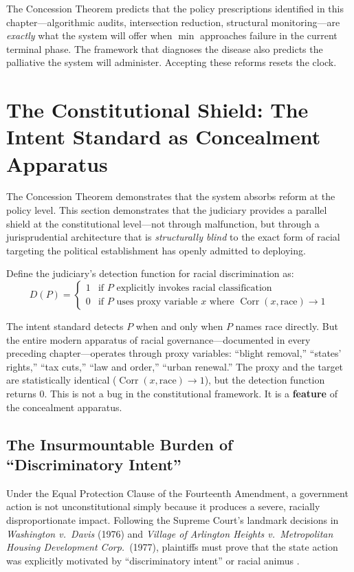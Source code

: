 \documentclass[12pt,openany]{book}
\begin{document}
The Concession Theorem predicts that the policy prescriptions identified in this chapter---algorithmic audits, intersection reduction, structural monitoring---are \textit{exactly} what the system will offer when $\min$ approaches failure in the current terminal phase. The framework that diagnoses the disease also predicts the palliative the system will administer. Accepting these reforms resets the clock.

\section{The Constitutional Shield: The Intent Standard as Concealment Apparatus}

The Concession Theorem demonstrates that the system absorbs reform at the policy level. This section demonstrates that the judiciary provides a parallel shield at the constitutional level---not through malfunction, but through a jurisprudential architecture that is \textit{structurally blind} to the exact form of racial targeting the political establishment has openly admitted to deploying.

Define the judiciary's detection function for racial discrimination as:
\[
D(P) = \begin{cases}
1 & \text{if } P \text{ explicitly invokes racial classification} \\
0 & \text{if } P \text{ uses proxy variable } x \text{ where } \operatorname{Corr}(x, \text{race}) \to 1
\end{cases}
\]

The intent standard detects $P$ when and only when $P$ names race directly. But the entire modern apparatus of racial governance---documented in every preceding chapter---operates through proxy variables: ``blight removal,'' ``states' rights,'' ``tax cuts,'' ``law and order,'' ``urban renewal.'' The proxy and the target are statistically identical ($\operatorname{Corr}(x, \text{race}) \to 1$), but the detection function returns 0. This is not a bug in the constitutional framework. It is a \textbf{feature} of the concealment apparatus.

\subsection{The Insurmountable Burden of ``Discriminatory Intent''}

Under the Equal Protection Clause of the Fourteenth Amendment, a government action is not unconstitutional simply because it produces a severe, racially disproportionate impact. Following the Supreme Court's landmark decisions in \textit{Washington v.\ Davis} (1976) and \textit{Village of Arlington Heights v.\ Metropolitan Housing Development Corp.}\ (1977), plaintiffs must prove that the state action was explicitly motivated by ``discriminatory intent'' or racial animus \cite{tel_wash_v_davis, tel_arlington_heights}.
\end{document}
